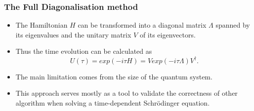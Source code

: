 \documentclass{beamer}
\begin{document}

\begin{frame}
	\frametitle{The Full Diagonalisation method}
	\begin{itemize}
		\item The Hamiltonian $H$ can be transformed into a diagonal matrix $\Lambda$ spanned by its eigenvalues and the unitary matrix $V$ of its eigenvectors.
		\item Thus the time evolution can be calculated as 
		\begin{equation*}
		U(\tau) = exp(-i\tau H) = V exp(-i\tau \Lambda) V^\dagger.
		\end{equation*}
		\item The main limitation comes from the size of the quantum system.
		\item This approach serves mostly as a tool to validate the correctness of other algorithm when solving a time-dependent Schrödinger equation.
	\end{itemize}
%	
\end{frame}

\end{document}

